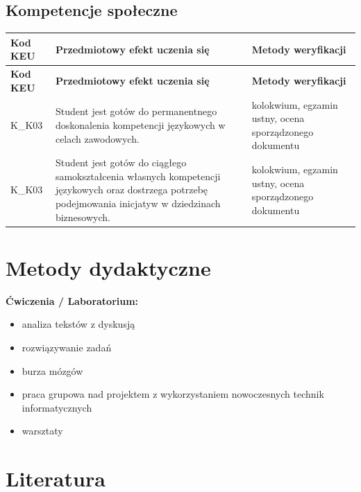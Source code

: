 \documentclass[12pt, a4paper]{article}
\newcommand{\thdrule}{\noalign{\global\setlength{\extrarowheight}{0pt}}}
\newcommand{\thdend}{\noalign{\global\setlength{\extrarowheight}{3pt}}}
\begin{document}
\subsection*{Kompetencje społeczne}
{\scriptsize
\begin{longtable}{m{1.6cm}m{9.0cm}m{4.2cm}}
\thdrule\toprule
\rowcolor{pjatkRed} {\color{white}\footnotesize\textbf{\vphantom{Ag}Kod KEU}} & {\color{white}\footnotesize\textbf{\vphantom{Ag}Przedmiotowy efekt uczenia się}} & {\color{white}\footnotesize\textbf{\vphantom{Ag}Metody weryfikacji}} \\
\midrule\thdend
\endfirsthead
\thdrule\toprule
\rowcolor{pjatkRed} {\color{white}\footnotesize\textbf{\vphantom{Ag}Kod KEU}} & {\color{white}\footnotesize\textbf{\vphantom{Ag}Przedmiotowy efekt uczenia się}} & {\color{white}\footnotesize\textbf{\vphantom{Ag}Metody weryfikacji}} \\
\midrule\thdend
\endhead
  \rowcolor{tableRowLight} K\_K03 & Student jest gotów do permanentnego doskonalenia kompetencji językowych w celach zawodowych. & kolokwium, egzamin ustny, ocena sporządzonego dokumentu \\
  \rowcolor{tableRowAlt} K\_K03 & Student jest gotów do ciągłego samokształcenia własnych kompetencji językowych oraz dostrzega potrzebę podejmowania inicjatyw w dziedzinach biznesowych. & kolokwium, egzamin ustny, ocena sporządzonego dokumentu \\
\bottomrule
\end{longtable}}

\section{Metody dydaktyczne}

\textbf{Ćwiczenia / Laboratorium:}
\begin{itemize}
  \item analiza tekstów z dyskusją
  \item rozwiązywanie zadań
  \item burza mózgów
  \item praca grupowa nad projektem z wykorzystaniem nowoczesnych technik informatycznych
  \item warsztaty
\end{itemize}
\vspace{4pt}


\section{Literatura}
\end{document}
